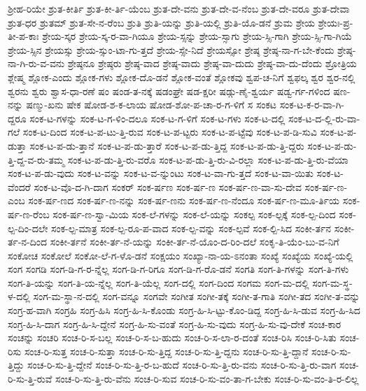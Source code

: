 {ಶ್ರೀಹ-ರಿಯೇ
ಶ್ರುತ-ಕೀರ್ತಿ
ಶ್ರುತ-ಕೀ-ರ್ತಿ-ಯೆಂಬ
ಶ್ರುತ-ದೇ-ವನು
ಶ್ರುತ-ದೇ-ವ-ನೆಂಬ
ಶ್ರುತ-ದೇ-ವರೂ
ಶ್ರುತ-ದೇವಾ
ಶ್ರುತ-ಧರ
ಶ್ರುತಮ್
ಶ್ರುತ-ಸೇ-ನ-ರೆಂಬ
ಶ್ರುತಿ
ಶ್ರುತಿ-ಯನ್ನು
ಶ್ರುತಿ-ಯಲ್ಲಿ
ಶ್ರುತಿ-ಯೊ-ಡನೆ
ಶ್ರುಮ
ಶ್ರೇಯ
ಶ್ರೇಯಃ-ಪ್ರ-ತೀ-ಪ-ಕಾಃ
ಶ್ರೇಯ-ಸ್ಕರ
ಶ್ರೇಯ-ಸ್ಕ-ರ-ವಾ-ಗಿಯೂ
ಶ್ರೇಯ-ಸ್ಸನ್ನು
ಶ್ರೇಯ-ಸ್ಸಾಗು
ಶ್ರೇಯ-ಸ್ಸಿ-ಗಾಗಿ
ಶ್ರೇಯ-ಸ್ಸಿ-ಗಾ-ಗಿಯೆ
ಶ್ರೇಯ-ಸ್ಸಿನ
ಶ್ರೇಯಸ್ಸು
ಶ್ರೇಯ-ಸ್ಸುಂ-ಟಾ-ಗು-ತ್ತದೆ
ಶ್ರೇಯ-ಸ್ಸೇ-ನಿದೆ
ಶ್ರೇಯಸ್ಸೋ
ಶ್ರೇಷ್ಠ
ಶ್ರೇಷ್ಠ-ನಾ-ಗ-ಬೇ-ಕೆಂದು
ಶ್ರೇಷ್ಠ-ನಾ-ಗಿ-ರು-ವ-ವನು
ಶ್ರೇಷ್ಠನೂ
ಶ್ರೇಷ್ಠರು
ಶ್ರೇಷ್ಠ-ವಾದ
ಶ್ರೇಷ್ಠ-ವಾದು
ಶ್ರೇಷ್ಠ-ವಾ-ದುದು
ಶ್ರೇಷ್ಠ-ವಾ-ದು-ದೆಂದು
ಶ್ರೋತ್ರಿಯ
ಶ್ಲೇಷ್ಮ
ಶ್ಲೋಕ-ಎಂದು
ಶ್ಲೋಕ-ಗಳು
ಶ್ಲೋಕ-ದೊ-ಡನೆ
ಶ್ಲೋಕ-ವಂತೆ
ಶ್ಲೋಕವು
ಶ್ವಪ-ಚ-ನಿಗೆ
ಶ್ವಫಲ್ಕ
ಶ್ವರ
ಶ್ವರ-ನಲ್ಲಿ
ಶ್ವರನು
ಶ್ವರು
ಶ್ವಾಸ-ಧಾ-ರಣೆ
ಷಂ
ಷಂಡ-ತ-ನಕ್ಕೆ
ಷಡಂಘ್ರೇ
ಷಡ-ಕ್ಷರೀ
ಷಡ್ಗು-ಣೈ-ಶ್ವರ್ಯ
ಷಡ್ವ-ರ್ಗ-ಗಳಿಂದ
ಷಣ-ನನ್ನು
ಷಣ್ಮು-ಖನು
ಷೇಕ
ಷೋಡ-ಶ-ಕ-ಲಾಯ
ಷೋಡ-ಶೋ-ಪ-ಚಾ-ರ-ಗ-ಳಿಗೆ
ಸ
ಸಂಕಟ
ಸಂಕ-ಟ-ಕ-ರ-ವಾ-ಗಿ-ದ್ದರೂ
ಸಂಕ-ಟ-ಗಳನ್ನು
ಸಂಕ-ಟ-ಗ-ಳಿಂ-ದಲೂ
ಸಂಕ-ಟ-ಗ-ಳಿಗೆ
ಸಂಕ-ಟ-ಗಳು
ಸಂಕ-ಟ-ದಲ್ಲಿ
ಸಂಕ-ಟ-ದ-ಲ್ಲಿ-ರು-ವಾ-ಗಲೆ
ಸಂಕ-ಟ-ದಿಂದ
ಸಂಕ-ಟ-ಪ-ಟು-ತ್ತಿ-ರುವ
ಸಂಕ-ಟ-ಪ-ಟ್ಟರು
ಸಂಕ-ಟ-ಪ-ಟ್ಟೆವು
ಸಂಕ-ಟ-ಪ-ಡಿ-ಸುವಿ
ಸಂಕ-ಟ-ಪ-ಡುತ್ತಾ
ಸಂಕ-ಟ-ಪ-ಡು-ತ್ತಾನೆ
ಸಂಕ-ಟ-ಪ-ಡು-ತ್ತಾರೆ
ಸಂಕ-ಟ-ಪ-ಡು-ತ್ತಿದ್ದ
ಸಂಕ-ಟ-ಪ-ಡು-ತ್ತಿ-ದ್ದರು
ಸಂಕ-ಟ-ಪ-ಡು-ತ್ತಿ-ದ್ದ-ವ-ರು-ತಮ್ಮ
ಸಂಕ-ಟ-ಪ-ಡು-ತ್ತಿ-ರು-ವರೊ
ಸಂಕ-ಟ-ಪ-ಡು-ತ್ತಿ-ರು-ವಿ-ರಲ್ಲಾ
ಸಂಕ-ಟ-ಪ-ಡು-ತ್ತಿ-ರು-ವೆಯಾ
ಸಂಕ-ಟ-ಪ-ಡು-ವುದು
ಸಂಕ-ಟ-ವನ್ನು
ಸಂಕ-ಟ-ವ-ನ್ನುಂಟು
ಸಂಕ-ಟ-ವಾ-ಗು-ತ್ತದೆ
ಸಂಕ-ಟ-ವಾ-ಯಿತು
ಸಂಕ-ಟ-ವೆಂದರೆ
ಸಂಕ-ಟ-ವೊ-ದ-ಗಿ-ದಾಗ
ಸಂಕರ್
ಸಂಕ-ರ್ಷಣ
ಸಂಕ-ರ್ಷ-ಣ
ಸಂಕ-ರ್ಷ-ಣ-ವಾ-ಸು-ದೇವ
ಸಂಕ-ರ್ಷ-ಣ-ಎಂಬ
ಸಂಕ-ರ್ಷ-ಣದ
ಸಂಕ-ರ್ಷ-ಣ-ನನ್ನು
ಸಂಕ-ರ್ಷ-ಣನು
ಸಂಕ-ರ್ಷ-ಣ-ನೆಂದೂ
ಸಂಕ-ರ್ಷ-ಣ-ಮೂ-ರ್ತಿಯ
ಸಂಕ-ರ್ಷ-ಣ-ರೆಂಬ
ಸಂಕ-ರ್ಷ-ಣ-ಸ್ವಾ-ಮಿಯ
ಸಂಕ-ಲೆ-ಗಳನ್ನು
ಸಂಕ-ಲೆ-ಯನ್ನು
ಸಂಕಲ್ಪ
ಸಂಕ-ಲ್ಪಕ್ಕೆ
ಸಂಕ-ಲ್ಪ-ದಿಂದ
ಸಂಕ-ಲ್ಪ-ದಿಂ-ದಲೇ
ಸಂಕ-ಲ್ಪ-ಮಾತ್ರ
ಸಂಕ-ಲ್ಪ-ರೂ-ಪ-ವಾದ
ಸಂಕ-ಲ್ಪ-ವನ್ನು
ಸಂಕ-ಲ್ಪವೆ
ಸಂಕ-ಲ್ಪಿ-ಸಿದ
ಸಂಕೀ-ರ್ತನ
ಸಂಕೀ-ರ್ತ-ನ-ದಿಂದ
ಸಂಕೀ-ರ್ತನೆ
ಸಂಕೀ-ರ್ತ-ನೆ-ಯನ್ನು
ಸಂಕೀ-ರ್ತ-ನೆ-ಯೊಂ-ದ-ರಿಂ-ದಲೆ
ಸಂಕೃ-ತಿ-ಯೆಂ-ಬು-ವ-ನಿಗೆ
ಸಂಕೋಚ
ಸಂಕೋಲೆ
ಸಂಕೋ-ಲೆ-ಗ-ಳೊ-ಡನೆ
ಸಂಕ್ಷಯಂ
ಸಂಖ್ಯಾ-ನಾ-ಯ-ಽನಂತಾ
ಸಂಖ್ಯೆ
ಸಂಖ್ಯೆಯ
ಸಂಖ್ಯೆ-ಯಲ್ಲಿ
ಸಂಗ
ಸಂಗಡಿ
ಸಂಗ-ಡಿ-ಗ-ರ-ನ್ನೆಲ್ಲ
ಸಂಗ-ಡಿ-ಗ-ರಿಗೂ
ಸಂಗ-ಡಿ-ಗ-ರೊ-ಡನೆ
ಸಂಗತಿ
ಸಂಗ-ತಿ-ಗಳನ್ನು
ಸಂಗ-ತಿ-ಗಳು
ಸಂಗ-ತಿ-ಯನ್ನು
ಸಂಗ-ತಿ-ಯ-ನ್ನೆಲ್ಲ
ಸಂಗ-ತಿ-ಯೆಲ್ಲ
ಸಂಗ-ದಲ್ಲಿ
ಸಂಗ-ದಿಂದ
ಸಂಗಮ
ಸಂಗ-ಮ-ದಲ್ಲಿ
ಸಂಗ-ಮ-ಸ್ಥ-ಳ-ದಲ್ಲಿ
ಸಂಗ-ಮ-ಸ್ಥಾ-ನ-ದಲ್ಲಿ
ಸಂಗ-ವನ್ನೂ
ಸಂಗವೇ
ಸಂಗೀತ
ಸಂಗೀ-ತಕ್ಕೆ
ಸಂಗೀ-ತ-ಗಾತಿ
ಸಂಗೀ-ತದ
ಸಂಗೀ-ತ-ವನ್ನು
ಸಂಗ್ರ-ಹ-ವಾಗಿ
ಸಂಗ್ರಹಿ
ಸಂಗ್ರ-ಹಿಸಿ
ಸಂಗ್ರ-ಹಿ-ಸಿ-ಕೊಂಡು
ಸಂಗ್ರ-ಹಿ-ಸಿ-ಟ್ಟು-ಕೊಂ-ಡಿದ್ದ
ಸಂಗ್ರ-ಹಿ-ಸಿ-ಡುವ
ಸಂಗ್ರ-ಹಿ-ಸಿದ
ಸಂಗ್ರ-ಹಿ-ಸಿ-ದಾಗ
ಸಂಗ್ರ-ಹಿ-ಸಿ-ದ್ದೇನೆ
ಸಂಗ್ರ-ಹಿ-ಸು-ವಂತೆ
ಸಂಗ್ರ-ಹಿ-ಸು-ವುದು
ಸಂಗ್ರ-ಹಿ-ಸು-ವು-ದೇಕೆ
ಸಂಚ-ಕಾರ
ಸಂಚನ್ನು
ಸಂಚರಿ
ಸಂಚ-ರಿ-ಸ-ಬಲ್ಲ
ಸಂಚ-ರಿ-ಸ-ಬ-ಹುದು
ಸಂಚ-ರಿ-ಸ-ಲಾ-ರ-ದಂತೆ
ಸಂಚ-ರಿಸಿ
ಸಂಚ-ರಿ-ಸಿತು
ಸಂಚ-ರಿಸು
ಸಂಚ-ರಿ-ಸುತ್ತ
ಸಂಚ-ರಿ-ಸುತ್ತಾ
ಸಂಚ-ರಿ-ಸು-ತ್ತಿದ್ದ
ಸಂಚ-ರಿ-ಸು-ತ್ತಿ-ದ್ದನು
ಸಂಚ-ರಿ-ಸು-ತ್ತಿ-ದ್ದಾನೆ
ಸಂಚ-ರಿ-ಸು-ತ್ತಿದ್ದು
ಸಂಚ-ರಿ-ಸು-ತ್ತಿ-ದ್ದೇನೆ
ಸಂಚ-ರಿ-ಸು-ತ್ತಿ-ರ-ಬ-ಹುದೆ
ಸಂಚ-ರಿ-ಸು-ತ್ತಿ-ರು-ವನು
ಸಂಚ-ರಿ-ಸು-ತ್ತಿ-ರು-ವಾಗ
ಸಂಚ-ರಿ-ಸು-ತ್ತಿ-ರುವೆ
ಸಂಚ-ರಿ-ಸು-ತ್ತಿ-ರು-ವೆನು
ಸಂಚ-ರಿ-ಸುವ
ಸಂಚ-ರಿ-ಸು-ವಂ-ತಾ-ಗ-ಬೇಕು
ಸಂಚ-ರಿ-ಸು-ವಂ-ತಿ-ರ-ಲಿಲ್ಲ
}
